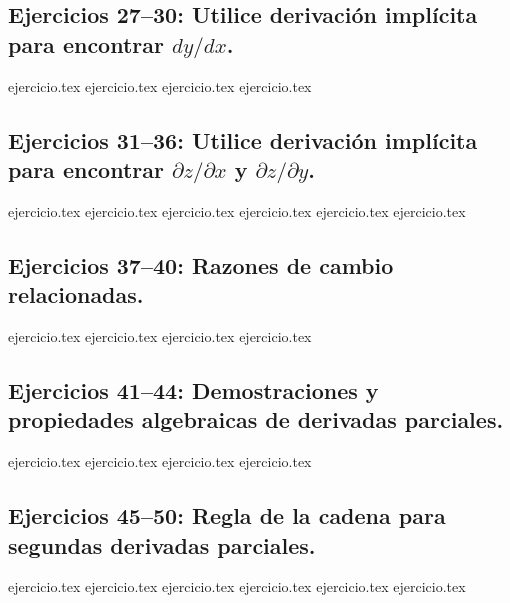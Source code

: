 \subsection*{Ejercicios 27--30: Utilice derivación implícita para encontrar $dy/dx$.}
\begin{enumerate}
    \setcounter{enumi}{26}
    {ejercicio.tex}
    {ejercicio.tex}
    {ejercicio.tex}
    {ejercicio.tex}
\end{enumerate}

\subsection*{Ejercicios 31--36: Utilice derivación implícita para encontrar $\partial z/\partial x$ y $\partial z/\partial y$.}
\begin{enumerate}
    \setcounter{enumi}{30}
    {ejercicio.tex}
    {ejercicio.tex}
    {ejercicio.tex}
    {ejercicio.tex}
    {ejercicio.tex}
    {ejercicio.tex}
\end{enumerate}

\subsection*{Ejercicios 37--40: Razones de cambio relacionadas.}
\begin{enumerate}
    \setcounter{enumi}{36}
    {ejercicio.tex}
    {ejercicio.tex}
    {ejercicio.tex}
    {ejercicio.tex}
\end{enumerate}

\subsection*{Ejercicios 41--44: Demostraciones y propiedades algebraicas de derivadas parciales.}
\begin{enumerate}
    \setcounter{enumi}{40}
    {ejercicio.tex}
    {ejercicio.tex}
    {ejercicio.tex}
    {ejercicio.tex}
\end{enumerate}

\subsection*{Ejercicios 45--50: Regla de la cadena para segundas derivadas parciales.}
\begin{enumerate}
    \setcounter{enumi}{44}
    {ejercicio.tex}
    {ejercicio.tex}
    {ejercicio.tex}
    {ejercicio.tex}
    {ejercicio.tex}
    {ejercicio.tex}
\end{enumerate}

